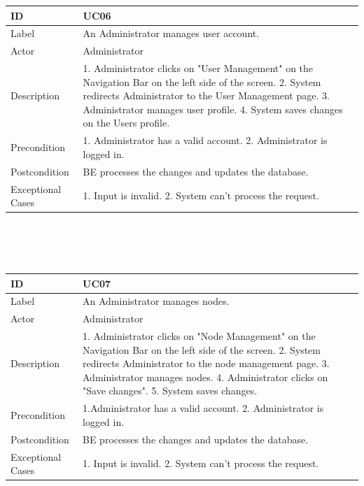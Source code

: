 \documentclass{scrreprt}
\begin{document}
\begin{tabularx}{12cm}{l|X}
	ID & UC06  \\
	\hline
	Label & 
	An Administrator manages user account. \\
	\hline
	Actor            & Administrator   \\
	\hline
	Description            &  	1. Administrator clicks on "User Management" on the Navigation Bar on the left side of the screen. 2. System redirects Administrator to the User Management page. 3. Administrator manages user profile. 4. System saves changes on the Users profile.   
	\\
	\hline
	Precondition           & 1. Administrator has a valid account. 2. Administrator is logged in.  \\
	\hline
	Postcondition     & BE processes the changes and updates the database. \\
	\hline
	Exceptional Cases & 1. Input is invalid. 2. System can't process the request.
	
\end{tabularx}
\\
\\ \\
\begin{tabularx}{12cm}{l|X}
	ID & UC07  \\
	\hline
	Label & 
	An Administrator manages nodes. \\
	\hline
	Actor            & Administrator    \\
	\hline
	Description            &  	1. Administrator clicks on "Node Management" on the Navigation Bar on the left side of the screen. 2. System redirects Administrator to the node management page. 3. Administrator manages nodes. 4. Administrator clicks on "Save changes". 5. System saves changes.  
	\\
	\hline
	Precondition           & 1.Administrator has a valid account. 2. Administrator is logged in.  \\
	\hline
	Postcondition     &  BE processes the changes and updates the database.\\
	\hline
	Exceptional Cases & 1. Input is invalid. 2. System can't process the request.
\end{tabularx}
\\
\\ \\
\end{document}
